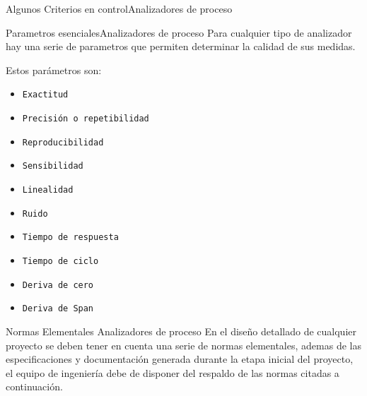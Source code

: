 \documentclass[10pt]{beamer}
\begin{document}
{\begin{frame}{Algunos Criterios en control}{Analizadores de proceso}
\end{frame}
\begin{frame}{Parametros esenciales}{Analizadores de proceso}
Para cualquier tipo de analizador hay una serie de parametros que permiten determinar la calidad de sus medidas.
\begin{block}{ }
Estos parámetros son:
  	\begin{itemize}
    \item {\tt Exactitud}
    \item {\tt Precisión o repetibilidad}
    \item {\tt Reproducibilidad}
    \item {\tt Sensibilidad}
    \item {\tt Linealidad}
    \item {\tt Ruido}
    \item {\tt Tiempo de respuesta}
    \item {\tt Tiempo de ciclo }
    \item {\tt Deriva de cero}
    \item {\tt Deriva de Span}
    \end{itemize}
	\end{block}  
\end{frame}

\begin{frame}{Normas Elementales }{Analizadores de proceso}
En el diseño detallado de cualquier proyecto se deben tener en cuenta una serie de normas elementales, ademas de las especificaciones y documentación generada durante la etapa inicial
del proyecto, el equipo de ingeniería debe de disponer del respaldo de las normas citadas a continuación.
\begin{block}{ }


\end{block}
\end{frame}}
\end{document}
